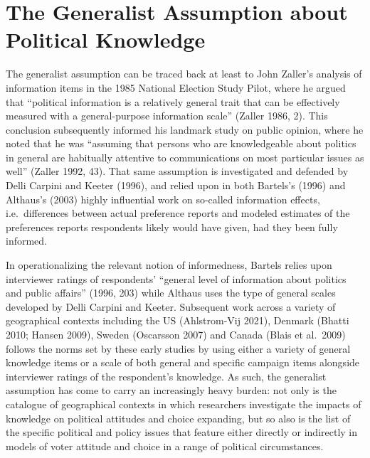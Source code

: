 \documentclass[12pt,halfline,a4paper,]{ouparticle}
\begin{document}
\hypertarget{the-generalist-assumption-about-political-knowledge}{%
\section{The Generalist Assumption about Political
Knowledge}\label{the-generalist-assumption-about-political-knowledge}}

The generalist assumption can be traced back at least to John Zaller's
analysis of information items in the 1985 National Election Study Pilot,
where he argued that ``political information is a relatively general
trait that can be effectively measured with a general-purpose
information scale'' (Zaller 1986, 2). This conclusion subsequently
informed his landmark study on public opinion, where he noted that he
was ``assuming that persons who are knowledgeable about politics in
general are habitually attentive to communications on most particular
issues as well'' (Zaller 1992, 43). That same assumption is investigated
and defended by Delli Carpini and Keeter (1996), and relied upon in both
Bartels's (1996) and Althaus's (2003) highly influential work on
so-called information effects, i.e.~differences between actual
preference reports and modeled estimates of the preferences reports
respondents likely would have given, had they been fully informed.

In operationalizing the relevant notion of informedness, Bartels relies
upon interviewer ratings of respondents' ``general level of information
about politics and public affairs'' (1996, 203) while Althaus uses the
type of general scales developed by Delli Carpini and Keeter. Subsequent
work across a variety of geographical contexts including the US
(Ahlstrom-Vij 2021), Denmark (Bhatti 2010; Hansen 2009), Sweden
(Oscarsson 2007) and Canada (Blais et al.~2009) follows the norms set by
these early studies by using either a variety of general knowledge items
or a scale of both general and specific campaign items alongside
interviewer ratings of the respondent's knowledge. As such, the
generalist assumption has come to carry an increasingly heavy burden:
not only is the catalogue of geographical contexts in which researchers
investigate the impacts of knowledge on political attitudes and choice
expanding, but so also is the list of the specific political and policy
issues that feature either directly or indirectly in models of voter
attitude and choice in a range of political circumstances.
\end{document}
